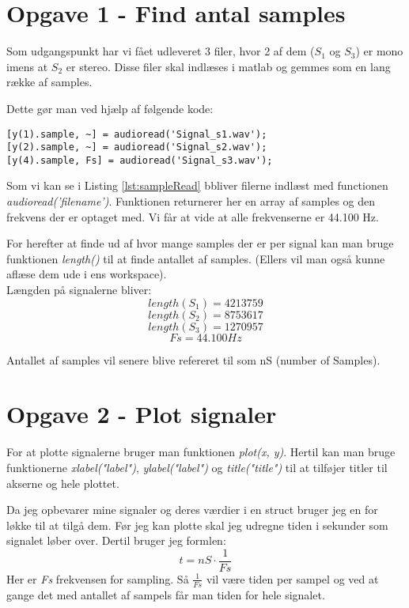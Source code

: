 \documentclass[../main.tex]{subfiles}
\begin{document}
\section{Opgave 1 - Find antal samples}
Som udgangspunkt har vi fået udleveret 3 filer, hvor 2 af dem ($S_1$ og $S_3$) er mono imens at $S_2$ er stereo.
Disse filer skal indlæses i matlab og gemmes som en lang række af samples.

Dette gør man ved hjælp af følgende kode:

\begin{lstlisting}[caption={Indlæsning af samples fra fil}, label={lst:sampleRead}]
% Loading files into arrays of samples
[y(1).sample, ~] = audioread('Signal_s1.wav');
[y(2).sample, ~] = audioread('Signal_s2.wav');
[y(4).sample, Fs] = audioread('Signal_s3.wav');
\end{lstlisting}
    
Som vi kan se i Listing \ref{lst:sampleRead} bbliver filerne indlæst med functionen \textit{audioread('filename')}.
Funktionen returnerer her en array af samples og den frekvens der er optaget med.
Vi får at vide at alle frekvenserne er 44.100 Hz.

For herefter at finde ud af hvor mange samples der er per signal kan man bruge funktionen \textit{length()} til at finde antallet af samples.
(Ellers vil man også kunne aflæse dem ude i ens workspace). \\
Længden på signalerne bliver:
\[length(S_1) = 4213759\]   
\[length(S_2) = 8753617\]
\[length(S_3) = 1270957\]
\[Fs = 44.100 Hz\]

Antallet af samples vil senere blive refereret til som nS (number of Samples).

\section{Opgave 2 - Plot signaler}
For at plotte signalerne bruger man funktionen \textit{plot(x, y)}.
Hertil kan man bruge funktionerne \textit{xlabel("label")}, \textit{ylabel("label")} og \textit{title("title")} til at tilføjer titler til akserne og hele plottet.

Da jeg opbevarer mine signaler og deres værdier i en struct bruger jeg en for løkke til at tilgå dem.
Før jeg kan plotte skal jeg udregne tiden i sekunder som signalet løber over. Dertil bruger jeg formlen:
\[t = nS\cdot \frac{1}{Fs}\]
Her er \textit{Fs} frekvensen for sampling. Så $\frac{1}{Fs}$ vil være tiden per sampel og ved at gange det med antallet af sampels får man tiden for hele signalet.
\end{document}
